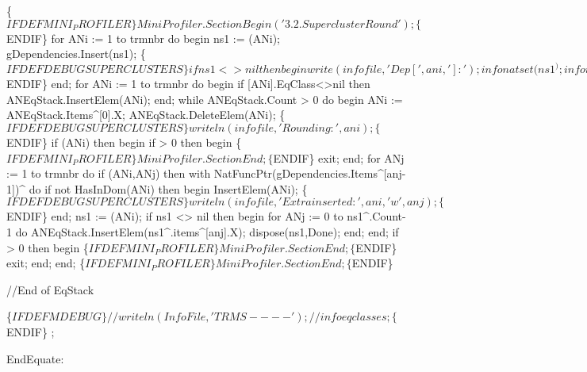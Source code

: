   \{$IFDEF MINI_PROFILER\}
   MiniProfiler.SectionBegin ('3.2. SuperclusterRound');
   \{$ENDIF\}
   for ANi := 1 to trmnbr do
   begin
      ns1 := (ANi);
      gDependencies.Insert(ns1);
      \{$IFDEF DEBUGSUPERCLUSTERS\}
      if ns1<>nil then begin write(infofile,'Dep[',ani,']:');infonatset(ns1^);infonewline; end;
      \{$ENDIF\}
   end;
   for ANi := 1 to trmnbr do
   begin
      if [ANi].EqClass<>nil then
         ANEqStack.InsertElem(ANi);
   end;
   while ANEqStack.Count > 0 do
   begin
      ANi := ANEqStack.Items^[0].X;
      ANEqStack.DeleteElem(ANi);
      \{$IFDEF DEBUGSUPERCLUSTERS\}
      writeln(infofile,'Rounding:    ',ani);
      \{$ENDIF\}
      if (ANi) then
      begin
         if  > 0 then
         begin
            \{$IFDEF MINI_PROFILER\}
            MiniProfiler.SectionEnd;
            \{$ENDIF\}
            exit;
         end;
         for ANj := 1 to trmnbr do
            if (ANi,ANj) then
               with NatFuncPtr(gDependencies.Items^[anj-1])^ do
                  if not HasInDom(ANi) then
                  begin
                     InsertElem(ANi);
                     \{$IFDEF DEBUGSUPERCLUSTERS\}
                     writeln(infofile,'Extra inserted:',ani,' w ', anj);
                     \{$ENDIF\}
                  end;
         ns1 := (ANi);
         if ns1 <> nil then
         begin
            for ANj := 0 to ns1^.Count-1 do
               ANEqStack.InsertElem(ns1^.items^[anj].X);
            dispose(ns1,Done);
         end;
      end;
      if  > 0 then
      begin
         \{$IFDEF MINI_PROFILER\}
         MiniProfiler.SectionEnd;
         \{$ENDIF\}
         exit;
      end;
   end;
   \{$IFDEF MINI_PROFILER\}
   MiniProfiler.SectionEnd;
   \{$ENDIF\}
   
   //End of EqStack
   
   \{$IFDEF MDEBUG\}
   //writeln(InfoFile,'TRMS ----');
   //infoeqclasses;
   \{$ENDIF\} ;
   
   EndEquate:
      
